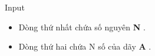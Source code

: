 Input
\begin{itemize}
	\item     Dòng thứ nhất chứa số nguyên    \textbf{     N    }    .   
	\item     Dòng thứ hai chứa N số của dãy    \textbf{     A    }    .   
\end{itemize}